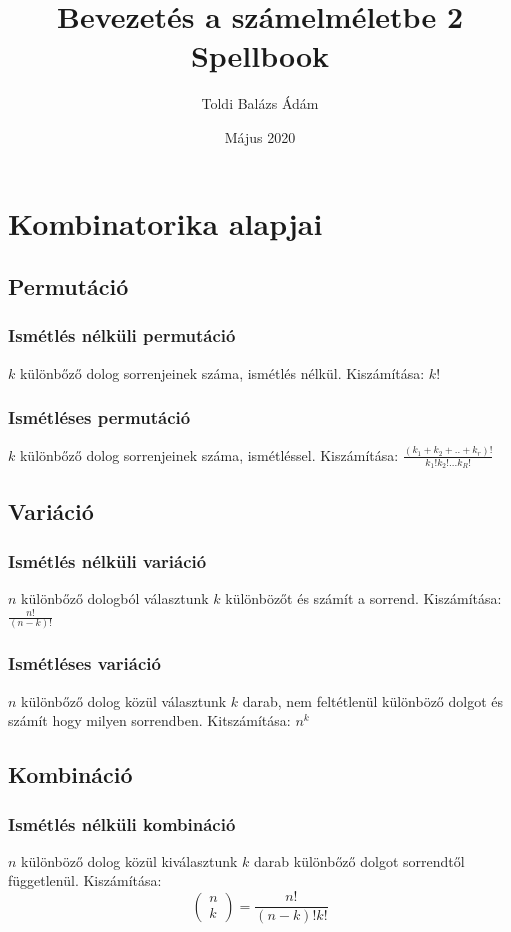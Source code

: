 \documentclass[12pt,a4paper,twoside]{report}
\title{Bevezetés a számelméletbe 2 Spellbook}
\author{Toldi Balázs Ádám }
\date{Május 2020}
\begin{document}
	
\maketitle
\tableofcontents
\newpage
\section{Kombinatorika alapjai}
\subsection{Permutáció}
\subsubsection{Ismétlés nélküli permutáció}
$k$ különbőző dolog sorrenjeinek száma, ismétlés nélkül.
Kiszámítása: $k!$
\subsubsection{Ismétléses permutáció}
$k$ különbőző dolog sorrenjeinek száma, ismétléssel.
Kiszámítása: $\frac{(k_1+k_2+..+k_r)!}{k_1!k_2!...k_R!}$
\subsection{Variáció}
\subsubsection{Ismétlés nélküli variáció}
$n$ különbőző dologból választunk $k$ különbözőt és számít a sorrend.
Kiszámítása:$\frac{n!}{(n-k)!}$
\subsubsection{Ismétléses variáció}
$n$ különbőző dolog közül választunk $k$ darab, nem feltétlenül különböző dolgot és számít hogy milyen sorrendben.
Kitszámítása: $n^k$
\subsection{Kombináció}
\subsubsection{Ismétlés nélküli kombináció}
$n$ különböző dolog közül kiválasztunk $k$ darab különbőző dolgot sorrendtől függetlenül. 
Kiszámítása: 
\begin{equation*}
\begin{pmatrix}
 n\\
 k
\end{pmatrix}
=\frac{n!}{(n-k)!k!}
\end{equation*}
\end{document}
